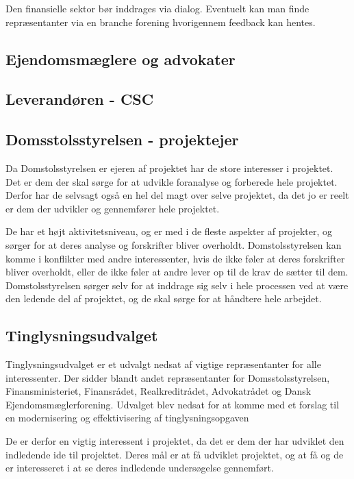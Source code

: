 \documentclass[10pt,a4paper,danish]{article}
\begin{document}
Den finansielle sektor bør inddrages via dialog. Eventuelt kan man finde
repræsentanter via en branche forening hvorigennem feedback kan hentes.

\subsection{Ejendomsmæglere og advokater}


\subsection{Leverandøren - CSC}


\subsection{Domsstolsstyrelsen - projektejer}
Da Domstolsstyrelsen er ejeren af projektet har de store interesser i projektet. Det er dem der skal sørge for at udvikle foranalyse og forberede hele projektet. Derfor har de selvsagt også en hel del magt over selve projektet, da det jo er reelt er dem der udvikler og gennemfører hele projektet.

De har et højt aktivitetsniveau, og er med i de fleste aspekter af projekter, og sørger for at deres analyse og forskrifter bliver overholdt. Domstolsstyrelsen kan komme i konflikter med andre interessenter, hvis de ikke føler at deres forskrifter bliver overholdt, eller de ikke føler at andre lever op til de krav de sætter til dem. Domstolsstyrelsen sørger selv for at inddrage sig selv i hele processen ved at være den ledende del af projektet, og de skal sørge for at håndtere hele arbejdet.


\subsection{Tinglysningsudvalget}

Tinglysningsudvalget er et udvalgt nedsat af vigtige repræsentanter for alle interessenter. Der sidder blandt andet repræsentanter for Domsstolsstyrelsen, Finansministeriet, Finansrådet, Realkreditrådet, Advokatrådet og Dansk Ejendomsmæglerforening. Udvalget blev nedsat for at komme med et forslag til en modernisering og effektivisering af tinglysningsopgaven

De er derfor en vigtig interessent i projektet, da det er dem der har udviklet den indledende ide til projektet. Deres mål er at få udviklet projektet, og at få og de er interesseret i at se deres indledende undersøgelse gennemført.
\end{document}
